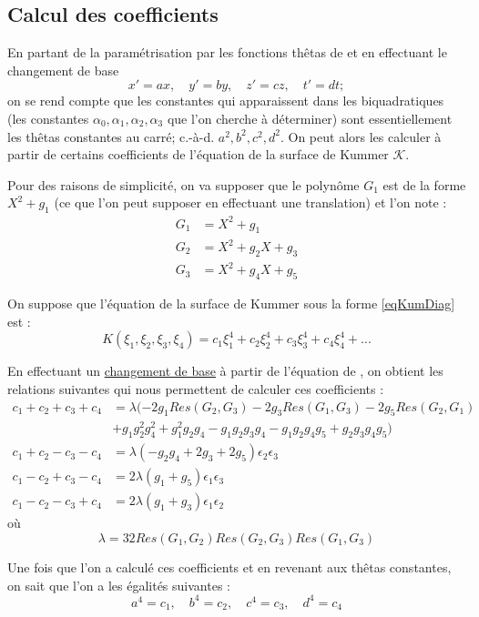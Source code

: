 \documentclass[a4paper,12pt]{article}
\theoremstyle{definition}
\theoremstyle{remark}
\numberwithin{equation}{section}
\begin{document}
\subsection{Calcul des coefficients}

En partant de la paramétrisation par les fonctions thêtas de \citep{gaudry} et en effectuant le changement de base
$$x'=ax, \quad y'=by, \quad z'=cz, \quad t'=dt;$$
on se rend compte que les constantes qui apparaissent dans les biquadratiques (les constantes $\alpha_0,\alpha_1,\alpha_2,\alpha_3$ que l'on cherche à déterminer) sont essentiellement les thêtas constantes au carré; c.-à-d. $a^2,b^2,c^2,d^2$. On peut alors les calculer à partir de certains coefficients de l'équation de la surface de Kummer $\mathcal{K}$.

Pour des raisons de simplicité, on va supposer que le polynôme $G_1$ est de la forme $X^2 + g_1$ (ce que l'on peut supposer en effectuant une translation) et l'on note :
\begin{align*}
G_1 &= X^2 + g_1 \\
G_2 &= X^2+g_2X+g_3 \\
G_3 &= X^2+g_4X+g_5
\end{align*}

On suppose que l'équation de la surface de Kummer sous la forme \ref{eqKumDiag} est :
$$K(\xi_1,\xi_2,\xi_3,\xi_4) = c_1\xi^4_1 + c_2\xi^4_2 + c_3\xi^4_3 + c_4\xi^4_4 + ...$$ 

En effectuant un \href{run:./chgBase.sag}{changement de base} à partir de l'équation de \citep{eqKum}, on obtient les relations suivantes qui nous permettent de calculer ces coefficients :
\begin{align*}
c_1+c_2+c_3+c_4 &= \lambda(-2g_1Res(G_2,G_3)-2g_3Res(G_1,G_3)-2g_5Res(G_2,G_1) \\
 &+ g_1g_2^2g_4^2 + g_1^2g_2g_4 - g_1g_2g_3g_4 - g_1g_2g_4g_5 + g_2g_3g_4g_5) \\
c_1+c_2-c_3-c_4 &= \lambda(-g_2g_4+2g_3+2g_5)\epsilon_2\epsilon_3 \\
c_1-c_2+c_3-c_4 &= 2\lambda(g_1+g_5)\epsilon_1\epsilon_3 \\
c_1-c_2-c_3+c_4 &= 2\lambda(g_1+g_3)\epsilon_1\epsilon_2
\end{align*}
où
$$\lambda = 32Res(G_1,G_2)Res(G_2,G_3)Res(G_1,G_3)$$

Une fois que l'on a calculé ces coefficients et en revenant aux thêtas constantes, on sait que l'on a les égalités suivantes :
$$a^4 = c_1, \quad b^4 = c_2, \quad c^4 = c_3, \quad d^4 = c_4$$
\end{document}
